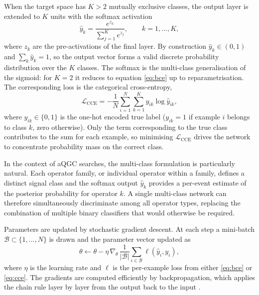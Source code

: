 When the target space has $K>2$ mutually exclusive classes, the output layer is extended to $K$ units with the softmax activation
\begin{equation}
\hat{y}_{k} = \frac{e^{z_{k}}}{\sum_{j=1}^{K}e^{z_{j}}}, \qquad k=1,\dots,K,
\label{eq:softmax}
\end{equation}
where $z_k$ are the pre-activations of the final layer.  By construction $\hat{y}_k\in(0,1)$ and $\sum_k\hat{y}_k=1$, so the output vector forms a valid discrete probability distribution over the $K$ classes.  The softmax is the multi-class generalisation of the sigmoid: for $K=2$ it reduces to equation \eqref{eq:bce} up to reparametrisation.  The corresponding loss is the categorical cross-entropy,
\begin{equation}
\mathcal{L}_{\mathrm{CCE}} = -\frac{1}{N}\sum_{i=1}^{N}\sum_{k=1}^{K} y_{ik}\log\hat{y}_{ik},
\label{eq:cce}
\end{equation}
where $y_{ik}\in\{0,1\}$ is the one-hot encoded true label ($y_{ik}=1$ if example $i$ belongs to class $k$, zero otherwise).  Only the term corresponding to the true class contributes to the sum for each example, so minimising $\mathcal{L}_{\mathrm{CCE}}$ drives the network to concentrate probability mass on the correct class.

In the context of aQGC searches, the multi-class formulation is particularly natural.  Each operator family, or individual operator within a family, defines a distinct signal class and the softmax output $\hat{y}_k$ provides a per-event estimate of the posterior probability for operator $k$.  A single multi-class network can therefore simultaneously discriminate among all operator types, replacing the combination of multiple binary classifiers that would otherwise be required.

Parameters are updated by stochastic gradient descent.  At each step a mini-batch $\mathcal{B}\subset\{1,\dots,N\}$ is drawn and the parameter vector updated as
\begin{equation}
\theta \leftarrow \theta - \eta\,\nabla_{\theta}\, \frac{1}{|\mathcal{B}|}\sum_{i\in\mathcal{B}}\ell(\hat{y}_i,y_i),
\end{equation}
where $\eta$ is the learning rate and $\ell$ is the per-example loss from either \eqref{eq:bce} or \eqref{eq:cce}.  The gradients are computed efficiently by backpropagation, which applies the chain rule layer by layer from the output back to the input \cite{Rumelhart_Backprop_1986}.



